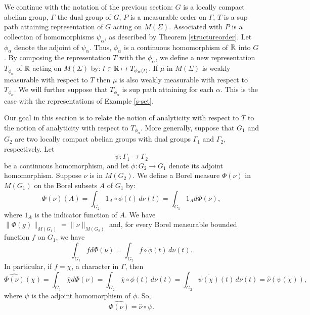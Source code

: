 \documentclass[12pt,leqno]{article}
\def\R{\Bbb R}
\begin{document}
We continue with the notation of the previous section:
$G$ is a locally compact abelian group,
$\Gamma$ the dual group of $G$, $P$ is a measurable
order on $\Gamma$, $T$ is a sup path 
attaining representation of $G$ acting on $M(\Sigma)$.
Associated with $P$ is a collection of homomorphisms
$\psi_\alpha$, as described by Theorem \ref{structureorder}.  Let $\phi_\alpha$ denote the 
adjoint of $\psi_\alpha$.  Thus, $\phi_\alpha$ is a continuous
homomorphism of $\R$ into $G$.
By composing the representation $T$ with the $\phi_\alpha$, we define a new representation $T_{\phi_\alpha}$ of $\R$ acting on $M(\Sigma)$ by:
$t\in \R \mapsto T_{\phi_\alpha(t)}$.  If $\mu$ in $M(\Sigma)$ is weakly measurable with respect to $T$
then $\mu$ is also weakly measurable with respect
to $T_{\phi_\alpha}$.  We will further suppose that
$T_{\phi_\alpha}$ is sup path attaining for each $\alpha$.  This is the case with the representations
of Example \ref{s-set}.

Our goal in this section is to relate the notion of
analyticity with respect to $T$ to the
notion of analyticity with respect to $T_{\phi_\alpha}$.
More generally, 
suppose that $G_1$ and $G_2$ are two
locally compact abelian groups with dual groups $\Gamma_1$ and
$\Gamma_2$, respectively.  Let 
$$\psi: \Gamma_1\rightarrow \Gamma_2$$
be a continuous homomorphism, and
let $\phi:G_2\rightarrow G_1$ denote its adjoint homomorphism.
Suppose
$\nu$ is in $M(G_2)$.  We define a Borel
measure $\Phi(\nu)$ in $M(G_1)$ on the 
Borel subsets $A$ of $G_1$ by:
\begin{equation}
\Phi(\nu)(A)=\int_{G_2} 1_A\circ \phi(t)\,d\nu(t)=
\int_{G_1} 1_A d\Phi(\nu),
\label{continuous-image1}
\end{equation}
where $1_A$ is the indicator function of $A$.
We have
$\|\Phi(g)\|_{M(G_1)}=\|\nu\|_{M(G_2)}$ and, for every Borel measurable
bounded function $f$ on $G_1$, we have
\begin{equation}
\int_{G_1} f d\Phi(\nu)=
\int_{G_2} f\circ \phi(t)\,d \nu (t).
\label{continuous-image2}
\end{equation}
In particular, if $f=\chi$, a character in
$\Gamma$, then
\begin{equation}
\widehat{\Phi(\nu)}(\chi)=\int_{G_1} \overline{\chi} d\Phi(\nu)=\int_{G_2} \overline{\chi}\circ \phi(t)\,d\nu(t)
=\int_{G_2} 
\overline{\psi(\chi)}(t)\, d\nu(t)=\widehat{\nu}(\psi(\chi)),
\label{continuous-image3}
\end{equation}
where $\psi$ is the adjoint homomorphism of $\phi$.
So, 
\begin{equation}
\widehat{\Phi(\nu)}=\widehat{\nu}\circ \psi.
\label{continuous-image4}
\end{equation}
\end{document}
